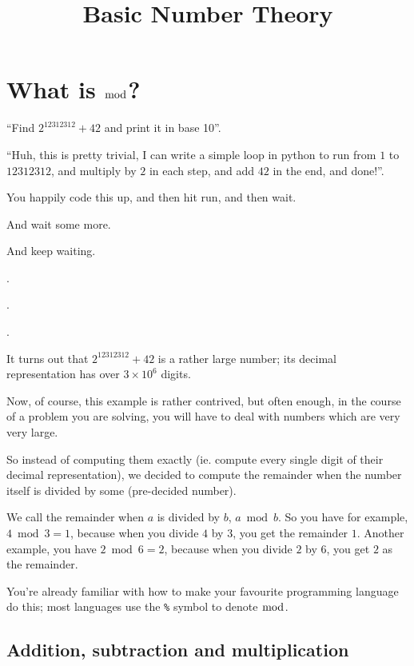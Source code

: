 \documentclass{article}
\title{Basic Number Theory}
\begin{document}
\maketitle
\tableofcontents

\section{What is $\bmod$?}

``Find $2^{12312312} + 42$ and print it in base 10''.

``Huh, this is pretty trivial, I can write a simple
loop in python to run from $1$ to $12312312$, and multiply by $2$
in each step, and add $42$ in the end, and done!''.

\vspace{1em}

You happily code this up, and then hit run, and then wait.

And wait some more.

And keep waiting.

.

.

.

It turns out that $2^{12312312} + 42$ is a rather large number;
its decimal representation has over $3 \times 10^6$ digits.

Now, of course, this example is rather contrived, but often enough,
in the course of a problem you are solving, you will have to deal
with numbers which are very very large.

So instead of computing them exactly (ie. compute every single digit
of their decimal representation), we decided to compute the remainder
when the number itself is divided by some (pre-decided number).

\vspace{1em}

We call the remainder when $a$ is divided by $b$, $a \bmod b$.
So you have for example, $4 \bmod 3 = 1$, because when you divide
$4$ by $3$, you get the remainder $1$.
Another example, you have $2 \bmod 6 = 2$, because when you divide $2$
by $6$, you get $2$ as the remainder.

You're already familiar with how to make your favourite programming language
do this; most languages use the \verb|%| symbol to denote $\bmod$.

\subsection{Addition, subtraction and multiplication}
\end{document}
